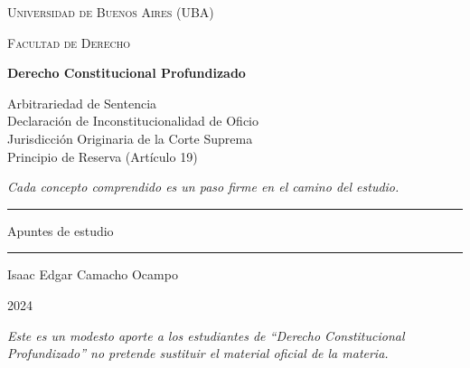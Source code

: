 \documentclass[12pt,oneside]{book}
\newcommand{\universidad}{Universidad de Buenos Aires (UBA)}
\newcommand{\facultad}{Facultad de Derecho}
\newcommand{\materia}{Derecho Constitucional Profundizado}
\newcommand{\autor}{Isaac Edgar Camacho Ocampo}
\newcommand{\anio}{2024}
\begin{document}
\frontmatter

\begin{titlepage}

\thispagestyle{empty}

\begin{center}

\vspace*{1cm}

{\large \textsc{\universidad}}

\vspace{0.2cm}

{\large \textsc{\facultad}}

\vspace{3cm}

{\Huge \textbf{\materia}}

\vspace{1cm}

{\large Arbitrariedad de Sentencia \\[0.2em]
Declaración de Inconstitucionalidad de Oficio \\[0.2em]
Jurisdicción Originaria de la Corte Suprema \\[0.2em]
Principio de Reserva (Artículo 19)}

\vspace{0.8cm}

{\small \textit{Cada concepto comprendido es un paso firme en el camino del estudio.}}

\vspace{1.2cm}

\rule{0.70\textwidth}{0.5pt}

\vspace{0.5cm}

{\large Apuntes de estudio}

\vspace{0.5cm}

\rule{0.70\textwidth}{0.5pt}

\vfill

{\large \autor}

\vspace{0.3cm}

{\large \anio}

\end{center}

\vfill

\begin{flushleft}
\textit{Este es un modesto aporte a los estudiantes de ``\materia'' no pretende sustituir el material oficial de la materia.}
\end{flushleft}

\end{titlepage}
\end{document}
